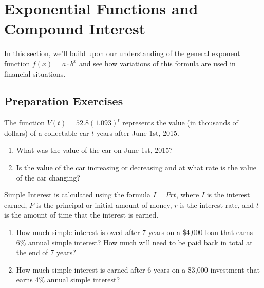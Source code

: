 
\section{Exponential Functions and Compound Interest} \label{exponential-compounding}

In this section, we'll build upon our understanding of the general exponent function $f(x) = a\cdot b^x$ and see how variations of this formula are used in financial situations. \\[0.5em]


\subsection*{Preparation Exercises} \label{prep-exponential-compounding}

\begin{myPrep}
The function $V(t) = 52.8(1.093)^t$ represents the value (in thousands of dollars) of a collectable car $t$ years after June 1st, 2015.
	\begin{enumerate}
		\item What was the value of the car on June 1st, 2015?
		\vfill
		\item Is the value of the car increasing or decreasing and at what rate is the value of the car changing?
		\vfill
	\end{enumerate}
\end{myPrep}

\begin{myPrep}
Simple Interest is calculated using the formula $I = P r t$, where $I$ is the interest earned, $P$ is the principal or initial amount of money, $r$ is the interest rate, and $t$ is the amount of time that the interest is earned.
	\begin{enumerate}
		\item How much simple interest is owed after 7 years on a \$4,000 loan that earns 6\% annual simple interest?  How much will need to be paid back in total at the end of 7 years?
				\vfill
		\vfill
		\item How much simple interest is earned after 6 years on a \$3,000 investment that earns 4\% annual simple interest?  
		\vfill
		\vfill
	\end{enumerate}
\end{myPrep}


